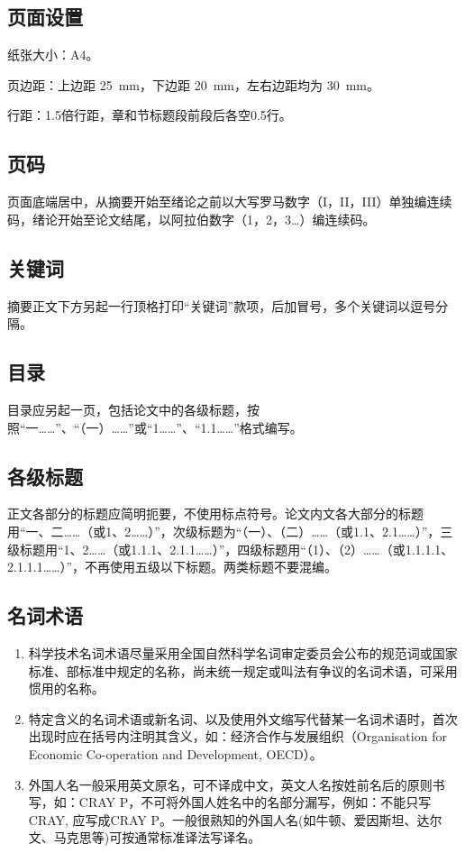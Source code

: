 \subsection{页面设置}

纸张大小：A4。

页边距：上边距 \SI{25}{mm}，下边距 \SI{20}{mm}，左右边距均为 \SI{30}{mm}。

行距：1.5倍行距，章和节标题段前段后各空0.5行。

\subsection{页码}

页面底端居中，从摘要开始至绪论之前以大写罗马数字（I，II，III）单独编连续码，绪论开始至论文结尾，以阿拉伯数字（1，2，3…）编连续码。

\subsection{关键词}

摘要正文下方另起一行顶格打印“关键词”款项，后加冒号，多个关键词以逗号分隔。

\subsection{目录}

目录应另起一页，包括论文中的各级标题，按照“一……”、“（一）……”或“1……”、“1.1……”格式编写。

\subsection{各级标题}\label{subsec-titlenumber}

正文各部分的标题应简明扼要，不使用标点符号。论文内文各大部分的标题用“一、二……（或1、2……）”，次级标题为“（一）、（二）……（或1.1、2.1……）”，三级标题用“1、2……（或1.1.1、2.1.1……）”，四级标题用“（1）、（2）……（或1.1.1.1、2.1.1.1……）”，不再使用五级以下标题。两类标题不要混编。

\subsection{名词术语}

\begin{enumerate}
    \item 科学技术名词术语尽量采用全国自然科学名词审定委员会公布的规范词或国家标准、部标准中规定的名称，尚未统一规定或叫法有争议的名词术语，可采用惯用的名称。
    \item 特定含义的名词术语或新名词、以及使用外文缩写代替某一名词术语时，首次出现时应在括号内注明其含义，如：经济合作与发展组织（Organisation for Economic Co-operation and Development, OECD）。
    \item 外国人名一般采用英文原名，可不译成中文，英文人名按姓前名后的原则书写，如：CRAY P，不可将外国人姓名中的名部分漏写，例如：不能只写CRAY, 应写成CRAY P。一般很熟知的外国人名(如牛顿、爱因斯坦、达尔文、马克思等)可按通常标准译法写译名。
\end{enumerate}

